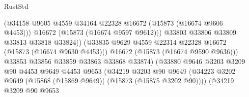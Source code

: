 \begin{lexlean}{RustStd}
\begin{coremodule}
                                              (@34158
                                                @9605
                                                @4559
                                                @34164
                                                @22328
                                                @16672
                                                (@15873 (@16674 @9606 @4453)))
                                              @16672
                                              (@15873 (@16674 @9597 @9612)))
                                            @33803
                                            @33806
                                            @33809
                                            @33813
                                            @33818
                                            @33824))
                                        (@33835
                                          @9629
                                          @4559
                                          @22314
                                          @22328
                                          @16672
                                          (@15873 (@16674 @9630 @4453)))
                                        @16672
                                        (@15873 (@16674 @9590 @9636)))
                                      @33853
                                      @33856
                                      @33859
                                      @33863
                                      @33868
                                      @33874)
                                    (@33880
                                      @9646
                                      @3203
                                      @3209
                                      @90
                                      @4453
                                      @9649
                                      @4453
                                      @9653
                                      (@34219
                                        @3203
                                        @90
                                        @9649
                                        (@34223
                                          @3202
                                          @9649
                                          (@15868 (@15869 @9649))
                                          (@15873 (@15875 @3202 @90))))
                                      (@34219
                                        @3209
                                        @90
                                        @9653

\end{coremodule}
\end{lexlean}
